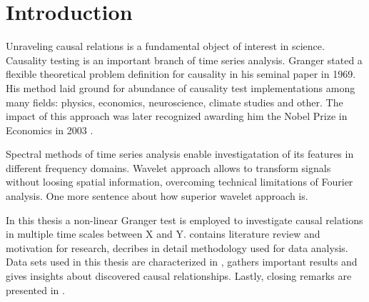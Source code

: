 \section{Introduction}

Unraveling causal relations is a fundamental object of interest in science.
Causality testing is an important branch of time series analysis.
Granger \cite{granger69} stated a flexible theoretical problem definition for causality in his seminal paper in 1969.
His method laid ground for abundance of causality test implementations among many fields:
physics, economics, neuroscience, climate studies and other. 
The impact of this approach was later recognized awarding him the Nobel Prize in Economics in 2003 \cite{nobel2003}.

Spectral methods of time series analysis enable investigatation of its features in different frequency domains.
Wavelet approach allows to transform signals without loosing spatial information, overcoming technical limitations of Fourier analysis.
One more sentence about how superior wavelet approach is.

In this thesis a non-linear Granger test is employed to investigate causal relations in multiple time scales between X and Y.
 contains literature review and motivation for research,
 decribes in detail methodology used for data analysis.
Data sets used in this thesis are characterized in ,
 gathers important results and gives insights about discovered causal relationships.
Lastly, closing remarks are presented in .
